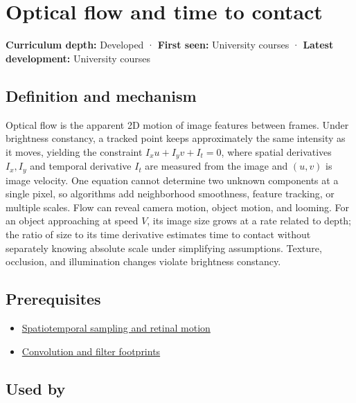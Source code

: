 \hypertarget{appendix-e2e73f8cd93e}{}\label{referencestart:appendix-e2e73f8cd93e}
\section{Optical flow and time to contact}\label{appendix-e2e73f8cd93e-optical-flow-and-time-to-contact}

\textbf{Curriculum depth:} Developed · \textbf{First seen:} University courses · \textbf{Latest development:} University courses

\subsection{Definition and mechanism}\label{appendix-e2e73f8cd93e-definition-and-mechanism}

Optical flow is the apparent 2D motion of image features between frames. Under brightness constancy, a tracked point keeps approximately the same intensity as it moves, yielding the constraint \(I_xu+I_yv+I_t=0\), where spatial derivatives \(I_x,I_y\) and temporal derivative \(I_t\) are measured from the image and \((u,v)\) is image velocity. One equation cannot determine two unknown components at a single pixel, so algorithms add neighborhood smoothness, feature tracking, or multiple scales. Flow can reveal camera motion, object motion, and looming. For an object approaching at speed \(V\), its image size grows at a rate related to depth; the ratio of size to its time derivative estimates time to contact without separately knowing absolute scale under simplifying assumptions. Texture, occlusion, and illumination changes violate brightness constancy.

\subsection{Prerequisites}\label{appendix-e2e73f8cd93e-prerequisites}

\begin{itemize}
\tightlist
\item
  \hyperref[appendix-70895739febb]{Spatiotemporal sampling and retinal motion}
\item
  \hyperref[appendix-d5b3c692d9f0]{Convolution and filter footprints}
\end{itemize}

\subsection{Used by}\label{appendix-e2e73f8cd93e-used-by}

